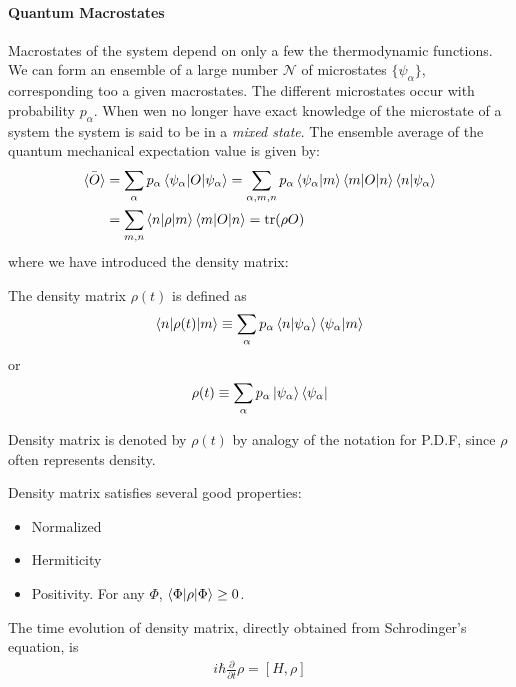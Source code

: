 \paragraph{Quantum Macrostates}
Macrostates of the system depend on only a few the thermodynamic
functions. We can form an ensemble of a large number $\mathcal{N}$ of
microstates $\{\psi_\alpha\}$, corresponding too a given macrostates.
The different microstates occur with probability $p_\alpha$.
When wen no longer have exact knowledge of the microstate of a
system the system is said to be in a \textit{mixed state}.
The ensemble average of the quantum mechanical expectation
value is given by:
\begin{align}
    \label{eq:quantum_macrostates_ensemble_avg}
    \bar{\braket{O}} &= 
        \sum_\alpha p_\alpha \braket{\psi_\alpha|O|\psi_\alpha}
        = \sum_{\alpha,m,n} p_\alpha
            \braket{\psi_\alpha|m}\braket{m|O|n}\braket{n|\psi_\alpha}
            \nonumber\\
        &= \sum_{m,n} \braket{n|\rho|m}\braket{m|O|n}
            = \text{tr}(\rho O)
\end{align}
where we have introduced the density matrix:
\begin{defi}
    The density matrix $\rho(t)$ is defined as
    \begin{align}
        \label{eq:density_matrix_def}
    \braket{n|\rho(t)|m} \equiv
    \sum_\alpha p_\alpha \braket{n|\psi_\alpha} \braket{\psi_\alpha|m}
    \end{align}
    or
    \begin{align}
        \label{eq:density_matrix_def_2}
        \rho(t) \equiv \sum_\alpha p_\alpha
            \ket{\psi_\alpha}\bra{\psi_\alpha}
    \end{align}
\end{defi}
Density matrix is denoted by $\rho(t)$ by analogy of the notation for
P.D.F, since $\rho$ often represents density.

Density matrix satisfies several good properties:
\begin{itemize}
    \item Normalized
    \item Hermiticity
    \item Positivity. For any $\Phi$, $\braket{\Phi|\rho|\Phi} \geq 0$.
\end{itemize}
The time evolution of density matrix, directly obtained from Schrodinger's
equation, is
\begin{align}
    \label{eq:quantum_macrostates:density_matrix:evolution}
    i\hbar \frac{\partial}{\partial t}\rho = [H,\rho]
\end{align}
